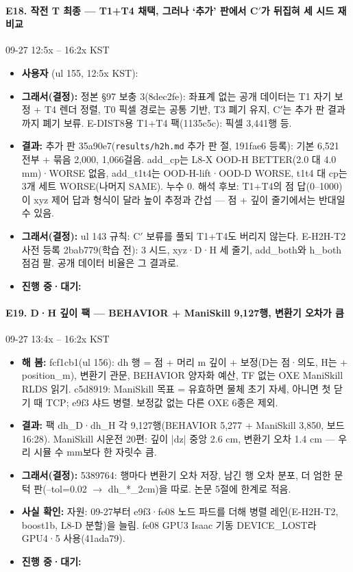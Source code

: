 \paragraph{E18. 작전 T 최종 --- T1+T4 채택, 그러나 `추가' 판에서 C$'$가 뒤집혀 세 시드 재비교}
{\small 09-27 12:5x -- 16:2x KST}
\begin{itemize}
  \item \textbf{사용자} (ul 155, 12:5x KST): 
  \item \textbf{그래서(결정):} 정본 §97 보충 3(8dec2fe): 좌표계 없는 공개 데이터는 T1 자기 보정 + T4 렌더 정렬, T0 픽셀 경로는 공통 기반, T3 폐기 유지, C$'$는 추가 판 결과까지 폐기 보류. E-DIST8용 T1+T4 팩(1135c5c): 픽셀 3,441행 등.
  \item \textbf{결과:} 추가 판 35a90e7(\texttt{results/\allowbreak{}h2h.\allowbreak{}md} 추가 판 절, 191fae6 등록): 기본 6,521 전부 + 묶음 2,000, 1,066걸음. add\_cp는 L8-X OOD-H BETTER(2.0 대 4.0 mm)·WORSE 없음, add\_t1t4는 OOD-H-lift·OOD-D WORSE, t1t4 대 cp는 3개 세트 WORSE(나머지 SAME). 누수 0. 해석 후보: T1+T4의 점 답(0--1000)이 xyz 제어 답과 형식이 달라 높이 추정과 간섭 --- 점 + 깊이 줄기에서는 반대일 수 있음.
  \item \textbf{그래서(결정):} ul 143 규칙: C$'$ 보류를 풀되 T1+T4도 버리지 않는다. E-H2H-T2 사전 등록 2bab779(학습 전): 3 시드, xyz·D·H 세 줄기, add\_both와 h\_both 점검 팔. 공개 데이터 비율은 그 결과로.
  \item \textbf{진행 중·대기:} 
\end{itemize}

\paragraph{E19. D·H 깊이 팩 --- BEHAVIOR + ManiSkill 9,127행, 변환기 오차가 큼}
{\small 09-27 13:4x -- 16:2x KST}
\begin{itemize}
  \item \textbf{해 봄:} fcf1cb1(ul 156): dh 행 = 점 + 머리 m 깊이 + 보정(D는 점·의도, H는 + position\_m), 변환기 관문, BEHAVIOR 양자화 예산, TF 없는 OXE ManiSkill RLDS 읽기. c5d8919: ManiSkill 목표 = 유효하면 물체 초기 자세, 아니면 첫 닫기 때 TCP; e9f3 샤드 병렬. 보정값 없는 다른 OXE 6종은 제외.
  \item \textbf{결과:} 팩 dh\_D·dh\_H 각 9,127행(BEHAVIOR 5,277 + ManiSkill 3,850, 보드 16:28). ManiSkill 시운전 20편: 깊이 |dz| 중앙 2.6 cm, 변환기 오차 1.4 cm --- 우리 시뮬 수 mm보다 한 자릿수 큼.
  \item \textbf{그래서(결정):} 5389764: 행마다 변환기 오차 저장, 남긴 행 오차 분포, 더 엄한 문턱 판(--tol=0.02 $\rightarrow$ dh\_*\_2cm)을 따로. 논문 5절에 한계로 적음.
  \item \textbf{사실 확인:} 자원: 09-27부터 e9f3·fe08 노드 파드를 더해 병렬 레인(E-H2H-T2, boost1b, L8-D 분할)을 늘림. fe08 GPU3 Isaac 기동 DEVICE\_LOST라 GPU4·5 사용(41ada79).
  \item \textbf{진행 중·대기:} 
\end{itemize}

